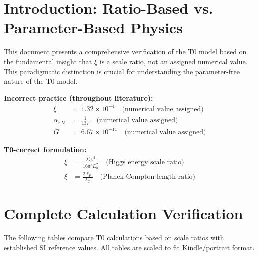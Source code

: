\section{Introduction: Ratio-Based vs. Parameter-Based Physics}
	
	This document presents a comprehensive verification of the T0 model based on the fundamental insight that $\xi$ is a scale ratio, not an assigned numerical value. This paradigmatic distinction is crucial for understanding the parameter-free nature of the T0 model.
	
	\begin{tcolorbox}[colback=red!5!white,colframe=red!75!black,title=Fundamental Literature Error]
		\textbf{Incorrect practice (throughout literature):}
		\begin{align}
			\xi &= 1.32 \times 10^{-4} \quad \text{(numerical value assigned)} \\
			\alpha_{\text{EM}} &= \frac{1}{137} \quad \text{(numerical value assigned)} \\
			G &= 6.67 \times 10^{-11} \quad \text{(numerical value assigned)}
		\end{align}
		
		\textbf{T0-correct formulation:}
		\begin{align}
			\xi &= \frac{\lambda_h^2 v^2}{16\pi^3 E_h^2} \quad \text{(Higgs energy scale ratio)} \\
			\xi &= \frac{2\ell_P}{\lambda_C} \quad \text{(Planck-Compton length ratio)}
		\end{align}
	\end{tcolorbox}
	
	\section{Complete Calculation Verification}
	
	The following tables compare T0 calculations based on scale ratios with established SI reference values. All tables are scaled to fit Kindle/portrait format.
	
